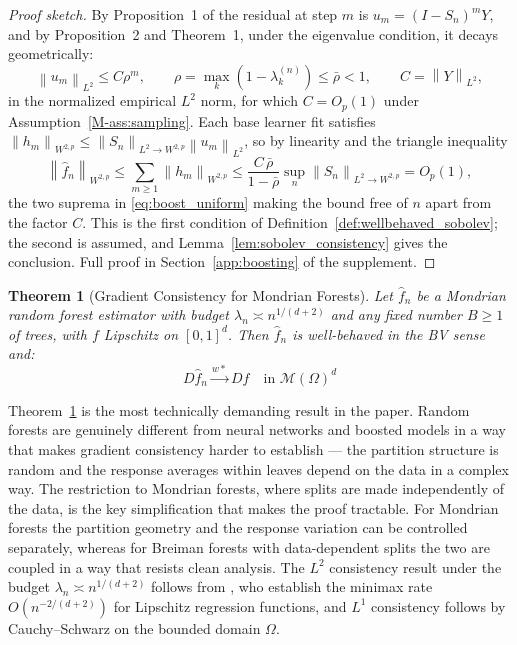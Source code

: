 \documentclass[12pt,a4paper]{article}
\numberwithin{equation}{section}
\theoremstyle{plain}
\newtheorem{theorem}{Theorem}
\theoremstyle{definition}
\newcommand{\norm}[1]{\left\| #1 \right\|}
\newcommand{\cM}{\mathcal{M}(\Omega)^d}
\newcommand{\fn}{\hat{f}_n}
\newcommand{\wstar}{\xrightarrow{w*}}
\begin{document}
	\begin{proof}[Proof sketch]
		By Proposition~1 of \citet{buhlmann2003boosting} the residual at step $m$
		is $u_m = (I - S_n)^m Y$, and by Proposition~2 and Theorem~1, under the
		eigenvalue condition, it decays geometrically:
		\begin{equation}
			\norm{u_m}_{L^2} \leq C\rho^m,
			\qquad \rho = \max_k\left(1-\lambda_k^{(n)}\right) \leq \bar{\rho} < 1,
			\qquad C = \norm{Y}_{L^2},
		\end{equation}
		in the normalized empirical $L^2$ norm, for which $C = O_p(1)$ under
		Assumption~\ref{M-ass:sampling}. Each base learner fit satisfies
		$\norm{h_m}_{W^{2,p}} \leq \norm{S_n}_{L^2 \to W^{2,p}} \norm{u_m}_{L^2}$,
		so by linearity and the triangle inequality
		\begin{equation}
			\norm{\fn}_{W^{2,p}}
			\leq \sum_{m \geq 1} \norm{h_m}_{W^{2,p}}
			\leq \frac{C\,\bar{\rho}}{1 - \bar{\rho}} \sup_n \norm{S_n}_{L^2 \to W^{2,p}}
			= O_p(1),
		\end{equation}
		the two suprema in \eqref{eq:boost_uniform} making the bound free of $n$
		apart from the factor $C$. This is the first condition of
		Definition~\ref{def:wellbehaved_sobolev}; the second is assumed, and
		Lemma~\ref{lem:sobolev_consistency} gives the conclusion. Full proof in
		Section~\ref{app:boosting} of the supplement.
	\end{proof}
	
	\begin{theorem}[Gradient Consistency for Mondrian Forests]
		\label{thm:forests}
		Let $\fn$ be a Mondrian random forest estimator with budget $\lambda_n \asymp
		n^{1/(d+2)}$ and any fixed number $B \geq 1$ of trees, with $f$ Lipschitz
		on $[0,1]^d$. Then $\fn$ is well-behaved in the BV sense and:
		\begin{equation}
			D\fn \wstar Df \quad \text{in } \cM
		\end{equation}
	\end{theorem}
	
	Theorem~\ref{thm:forests} is the most technically demanding result in the paper.
	Random forests are genuinely different from neural networks and boosted models in a
	way that makes gradient consistency harder to establish --- the partition structure is
	random and the response averages within leaves depend on the data in a complex way.
	The restriction to Mondrian forests, where splits are made independently of the data,
	is the key simplification that makes the proof tractable. For Mondrian forests the
	partition geometry and the response variation can be controlled separately, whereas for
	Breiman forests with data-dependent splits the two are coupled in a way that resists
	clean analysis. The $L^2$ consistency result under the budget $\lambda_n \asymp
	n^{1/(d+2)}$ follows from \citet{mourtada2017mondrian}, who establish the minimax rate
	$O(n^{-2/(d+2)})$ for Lipschitz regression functions, and $L^1$ consistency follows
	by Cauchy--Schwarz on the bounded domain $\Omega$.
	
\end{document}

